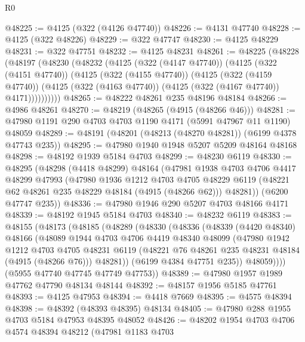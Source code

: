 \begin{lexlean}{R0}
\begin{coremodule}
@48225 := @4125 (@322 (@4126 @47740))
@48226 := @4131 @47740
@48228 := @4125 (@322 @48226)
@48229 := @322 @47747
@48230 := @4125 @48229
@48231 := @322 @47751
@48232 := @4125 @48231
@48261 := @48225
    (@48228
      (@48197
        (@48230
          (@48232
            (@4125
              (@322 (@4147 @47740))
              (@4125
                (@322 (@4151 @47740))
                (@4125
                  (@322 (@4155 @47740))
                  (@4125
                    (@322 (@4159 @47740))
                    (@4125 (@322 (@4163 @47740)) (@4125 (@322 (@4167 @47740)) @4171))))))))))
@48265 := @48222 @48261 @235 @48196 @48184
@48266 := @4986 @48261
@48270 := @48219 (@48265 (@4915 (@48266 @46)))
@48281 := @47980 @1191 @290 @4703 @4703 @1190 @4171 (@5991 @47967 @11 @1190) @48059
@48289 := @48191 (@48201 (@48213 (@48270 @48281)) (@6199 @4378 @47743 @235))
@48295 := @47980 @1940 @1948 @5207 @5209 @48164 @48168
@48298 := @48192 @1939 @5184 @4703
@48299 := @48230 @6119
@48330 := @48295
    (@48298
      (@4418 @48299)
      @48164
      (@47981
        @1938
        @4703
        @4706
        @4417
        @48299
        @47993
        (@47980
          @1936
          @1212
          @4703
          @4705
          @48229
          @6119
          (@48221 @62 @48261 @235 @48229 @48184 (@4915 (@48266 @62)))
          @48281))
      (@6200 @47747 @235))
@48336 := @47980 @1946 @290 @5207 @4703 @48166 @4171
@48339 := @48192 @1945 @5184 @4703
@48340 := @48232 @6119
@48383 := @48155
    (@48173
      (@48185
        (@48289
          (@48330
            (@48336
              (@48339
                (@4420 @48340)
                @48166
                (@48089
                  @1944
                  @4703
                  @4706
                  @4419
                  @48340
                  @48099
                  (@47980
                    @1942
                    @1212
                    @4703
                    @4705
                    @48231
                    @6119
                    (@48221 @76 @48261 @235 @48231 @48184 (@4915 (@48266 @76)))
                    @48281))
                (@6199 @4384 @47751 @235))
              @48059))))
      (@5955 @47740 @47745 @47749 @47753))
@48389 := @47980 @1957 @1989 @47762 @47790 @48134 @48144
@48392 := @48157 @1956 @5185 @47761
@48393 := @4125 @47953
@48394 := @4418 @7669
@48395 := @4575 @48394
@48398 := @48392 (@48393 @48395) @48134
@48405 := @47980 @288 @1955 @4703 @5184 @47953 @48395 @48052
@48426 := @48202
    @1954
    @4703
    @4706
    @4574
    @48394
    @48212
    (@47981
      @1183
      @4703

\end{coremodule}
\end{lexlean}
